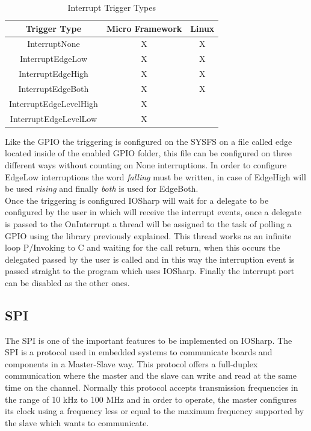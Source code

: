 \begin{table}[htb]
\begin{center}
\begin{tabular}{|c|c|c|}
\hline
{\bf Trigger Type} & {\bf Micro Framework} & {\bf Linux}  \\ \hline \hline
InterruptNone        & X    & X       \\ \hline
InterruptEdgeLow        & X    & X       \\ \hline
InterruptEdgeHigh        & X    & X       \\ \hline
InterruptEdgeBoth        & X    & X       \\ \hline
InterruptEdgeLevelHigh        & X    &        \\ \hline
InterruptEdgeLevelLow        & X    &        \\ \hline
\end{tabular}
\caption{Interrupt Trigger Types}
\label{T:Interrupt-Trigger-Types}
\end{center}
\end{table}

Like the GPIO the triggering is configured on the SYSFS on a file called edge located inside of the enabled GPIO folder, this file can be configured on three different ways without counting on None interruptions. In order to configure EdgeLow interruptions the word \textit{falling} must be written, in case of EdgeHigh will be used \textit{rising} and finally \textit{both} is used for EdgeBoth.
\\
Once the triggering is configured IOSharp will wait for a delegate to be configured by the user in which will receive the interrupt events, once a delegate is passed to the OnInterrupt a thread will be assigned to the task of polling a GPIO using the library previously explained. This thread works as an infinite loop P/Invoking to C and waiting for the call return, when this occurs the delegated passed by the user is called and in this way the interruption event is passed straight to the program which uses IOSharp. Finally the interrupt port can be disabled as the other ones.

\subsection{SPI}\label{SS:IOSharp-SPI}
The \gls{SPI} is one of the important features to be implemented on IOSharp. The SPI is a protocol used in embedded systems to communicate boards and components in a Master-Slave way. This protocol offers a full-duplex communication where the master and the slave can write and read at the same time on the channel. Normally this protocol accepts transmission frequencies in the range of 10 kHz to 100 MHz and in order to operate, the master configures its clock using a frequency less or equal to the maximum frequency supported by the slave which wants to communicate.

